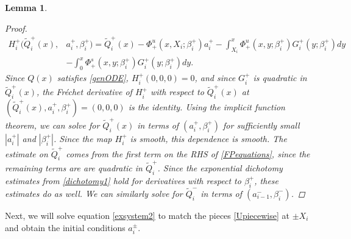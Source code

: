 \documentclass[12pt]{elsarticle}
\theoremstyle{plain}
\newtheorem{lemma}[theorem]{Lemma}
\theoremstyle{definition}
\theoremstyle{remark}
\numberwithin{theorem}{section}
\numberwithin{equation}{section}
\begin{document}
\begin{lemma}
\begin{proof}
\begin{align*}
H_i^+(\tilde{Q}_i^+(x), &a_i^+, \beta_i^+) = \tilde{Q}_i^+(x) - \Phi^u_+(x, X_i; \beta_i^+) a_i^+ - \int_{X_i}^x \Phi_+^u(x, y; \beta_i^+) G_i^+(y; \beta_i^+)dy \\
&- \int_0^x \Phi_+^s(x, y; \beta_i^+) G_i^+(y; \beta_i^+)dy.
\end{align*}
Since $Q(x)$ satisfies \cref{genODE}, $H_i^+(0, 0, 0) = 0$, and since $G_i^+$ is quadratic in $\tilde{Q}_i^+(x)$, the Fr\'echet derivative of $H_i^+$ with respect to $\tilde{Q}_i^+(x)$ at $(\tilde{Q}_i^+(x), a_i^+, \beta_i^+) = (0, 0, 0)$ is the identity. Using the implicit function theorem, we can solve for $\tilde{Q}_i^+(x)$ in terms of $(a_i^+, \beta_i^+)$ for sufficiently small $|a_i^+|$ and $|\beta_i^+|$. Since the map $H_i^+$ is smooth, this dependence is smooth. The estimate on $\tilde{Q}_i^+$ comes from the first term on the RHS of \cref{FPequations}, since the remaining terms are are quadratic in $\tilde{Q}_i^+$. Since the exponential dichotomy estimates from \cref{dichotomy1} hold for derivatives with respect to $\beta_i^+$, these estimates do as well. We can similarly solve for $\tilde{Q}_i^-$ in terms of $(a_{i-1}^-, \beta_i^-)$.
\end{proof}
\end{lemma}

Next, we will solve equation \cref{exsystem2} to match the pieces \cref{Upiecewise} at $\pm X_i$ and obtain the initial conditions $a_i^\pm$.
\end{document}
